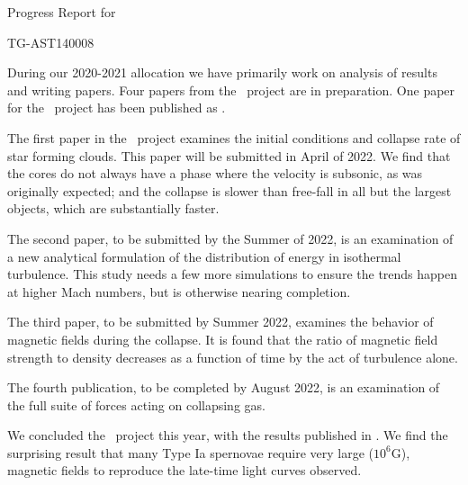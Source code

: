 \documentclass[11pt]{NSF}  %
\begin{document}
\begin{centering}
\begin{LARGE}
Progress Report for

TG-AST140008

\end{LARGE}
\end{centering}


\pagestyle{plain}

During our 2020-2021 allocation we have primarily work on analysis of results and writing papers.
Four papers
from the \nameCores\ project are in preparation.
One paper for the
\nameSupernova\ project has been published as \citep{Hristov21}.

The first paper in the \nameCores\ project examines the initial conditions and
collapse rate of star forming clouds.  This paper will be submitted in April
of 2022. 
  We find that the cores do not always have a
phase where the velocity is subsonic, as was originally expected; and the
collapse is slower than free-fall in all but the largest objects, which are
substantially faster.

The second paper, to be submitted  by the Summer of 2022, is an examination
of a new analytical formulation of the distribution of energy in isothermal
turbulence.  This study needs a few more simulations to ensure the trends happen at
higher Mach numbers, but is otherwise nearing completion.

The third paper, to be submitted by Summer 2022,
examines the behavior of magnetic fields during the collapse.   It is found that
the ratio of magnetic field strength to density decreases as a function of time
by the act of turbulence alone.  

The fourth publication, to be completed by August 2022, is an examination of the
full suite of forces acting on collapsing gas.  

We concluded the \nameSupernova\ project this year, with the results published
in \citep{Hristov21}.  We find the surprising result that many Type Ia spernovae
require very large ($10^6$G), magnetic fields to reproduce the late-time light
curves observed.  


\end{document}
